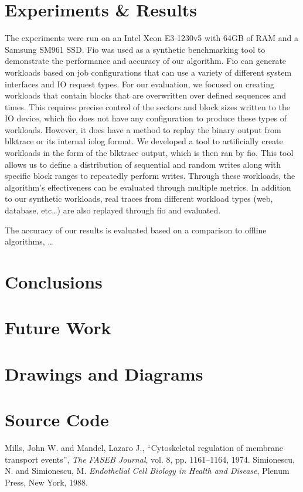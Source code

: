 \documentclass[MEng]{uofl}
\begin{document}
\chapter{Experiments \& Results}
The experiments were run on an Intel Xeon E3-1230v5 with 64GB of RAM and a Samsung SM961 SSD. Fio was used as a synthetic benchmarking tool to demonstrate the performance and accuracy of our algorithm. Fio can generate workloads based on job configurations that can use a variety of different system interfaces and IO request types. For our evaluation, we focused on creating workloads that contain blocks that are overwritten over defined sequences and times. This requires precise control of the sectors and block sizes written to the IO device, which fio does not have any configuration to produce these types of workloads. However, it does have a method to replay the binary output from blktrace or its internal iolog format. We developed a tool to artificially create workloads in the form of the blktrace output, which is then ran by fio. This tool allows us to define a distribution of sequential and random writes along with specific block ranges to repeatedly perform writes. Through these workloads, the algorithm’s effectiveness can be evaluated through multiple metrics. In addition to our synthetic workloads, real traces from different workload types (web, database, etc…) are also replayed through fio and evaluated. 

The accuracy of our results is evaluated based on a comparison to offline algorithms, …

\chapter{Conclusions}

\chapter{Future Work}


\appendix
\chapter{Drawings and Diagrams}
\chapter{Source Code}



\begin{thebibliography}{99}
\singlespace
{} {Mills, John W. and Mandel, Lazaro J.},
``Cytoskeletal regulation of membrane transport events'',
\emph{The FASEB Journal}, vol. 8, pp. 1161--1164, 1974.
 {Simionescu, N. and Simionescu, M.}
\emph{Endothelial Cell Biology in Health and Disease},
Plenum Press, New York, 1988.
\end{thebibliography}
\end{document}
